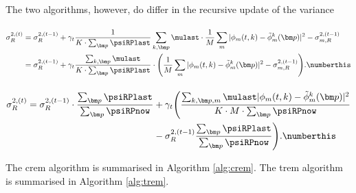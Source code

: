 The two algorithms, however, do differ in the recursive update of the variance

\paragraph{}
\begin{align*}
    \sigma_R^{2,(t)} &= \sigma_R^{2,(t-1)}+\gamma_t\frac{1}{K\*\sum_{\bm p}\psiRPlast} \sum_{k,\bm p}\mulast\*\frac{1}{M}\sum_{m}|\phi_m(t,k)-\tilde\phi_m^k(\bm p)|^2-\sigma_{m,R}^{2,(t-1)}\\
                     &= \sigma_R^{2,(t-1)}+\gamma_t\frac{\sum_{k,\bm p}\mulast}{K\*\sum_{\bm p}\psiRPlast} \*\Bigg ( \frac{1}{M}\sum_{m}|\phi_m(t,k)-\tilde\phi_m^k(\bm p)|^2-\sigma_{m,R}^{2,(t-1)}\Bigg ).
\numberthis\label{eq:trem-var}
\end{align*}

\paragraph{}
\begin{align*}
    \sigma_R^{2,(t)} = \sigma_R^{2,(t-1)}\cdot\frac{\sum_{\bm p}\psiRPlast}{\sum_{\bm p}\psiRPnow}&+\gamma_t\Bigg ( \frac{\sum_{k,\bm p,m}\mulast|\phi_m(t,k)-\tilde\phi_m^k(\bm p)|^2}{K \* M \* \sum_{\bm p}\psiRPnow}\\
    &-\sigma_R^{2,(t-1)}\frac{\sum_{\bm p}\psiRPlast}{\sum_{\bm p}\psiRPnow} \Bigg ).
\numberthis\label{eq:crem-var}
\end{align*}





The \gls{crem} algorithm is summarised in Algorithm \ref{alg:crem}.
The \gls{trem} algorithm is summarised in Algorithm \ref{alg:trem}.
